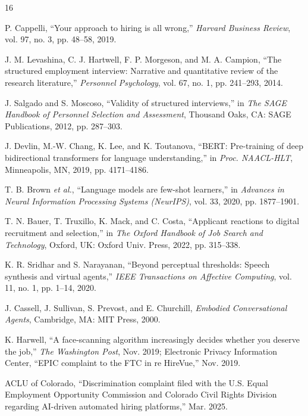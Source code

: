 \documentclass[conference]{IEEEtran}
\begin{document}
\begin{thebibliography}{16}

P. Cappelli,
``Your approach to hiring is all wrong,''
\textit{Harvard Business Review},
vol. 97, no. 3, pp. 48--58, 2019.

J. M. Levashina, C. J. Hartwell, F. P. Morgeson, and M. A. Campion,
``The structured employment interview: Narrative and quantitative review of the research literature,''
\textit{Personnel Psychology},
vol. 67, no. 1, pp. 241--293, 2014.

J. Salgado and S. Moscoso,
``Validity of structured interviews,''
in \textit{The SAGE Handbook of Personnel Selection and Assessment},
Thousand Oaks, CA: SAGE Publications, 2012, pp. 287--303.

J. Devlin, M.-W. Chang, K. Lee, and K. Toutanova,
``BERT: Pre-training of deep bidirectional transformers for language understanding,''
in \textit{Proc. NAACL-HLT},
Minneapolis, MN, 2019, pp. 4171--4186.

T. B. Brown \textit{et al.},
``Language models are few-shot learners,''
in \textit{Advances in Neural Information Processing Systems (NeurIPS)},
vol. 33, 2020, pp. 1877--1901.

T. N. Bauer, T. Truxillo, K. Mack, and C. Costa,
``Applicant reactions to digital recruitment and selection,''
in \textit{The Oxford Handbook of Job Search and Technology},
Oxford, UK: Oxford Univ. Press, 2022, pp. 315--338.

K. R. Sridhar and S. Narayanan,
``Beyond perceptual thresholds: Speech synthesis and virtual agents,''
\textit{IEEE Transactions on Affective Computing},
vol. 11, no. 1, pp. 1--14, 2020.

J. Cassell, J. Sullivan, S. Prevost, and E. Churchill,
\textit{Embodied Conversational Agents},
Cambridge, MA: MIT Press, 2000.

K. Harwell,
``A face-scanning algorithm increasingly decides whether you deserve the job,''
\textit{The Washington Post},
Nov. 2019;
Electronic Privacy Information Center,
``EPIC complaint to the FTC in re HireVue,''
Nov. 2019.

ACLU of Colorado,
``Discrimination complaint filed with the U.S. Equal Employment Opportunity Commission and Colorado Civil Rights Division regarding AI-driven automated hiring platforms,''
Mar. 2025.


\end{thebibliography}
\end{document}
